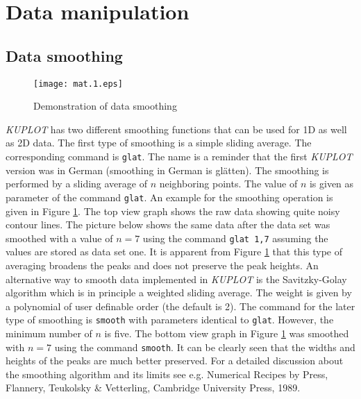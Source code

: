 
\section{Data manipulation \label{mat-man}}

\subsection{Data smoothing \label{mat-smooth}}

\begin{figure}[!ptb]
   \centering
   \texttt{[image: mat.1.eps]}
   \caption{Demonstration of data smoothing}
   \label{mat-fig1}
\end{figure}

{\it KUPLOT} has two different smoothing functions that can be used
for 1D as well as 2D data. The first type of smoothing is a simple
sliding average. The corresponding command is {\tt glat}. The name
is a reminder that the first {\it KUPLOT} version was in German
(smoothing in German is gl\"atten). The smoothing is performed by a
sliding average of $n$ neighboring points. The value of $n$ is given
as parameter of the command {\tt glat}. An example for the smoothing
operation is given in Figure \ref{mat-fig1}. The top view graph
shows the raw data showing quite noisy contour lines. The picture
below shows the same data after the data set was smoothed with a
value of $n=7$ using the command {\tt glat 1,7} assuming the values
are stored as data set one. It is apparent from Figure
\ref{mat-fig1} that this type of averaging broadens the peaks and
does not preserve the peak heights. An alternative way to smooth
data implemented in {\it KUPLOT} is the Savitzky-Golay algorithm
which is in principle a weighted sliding average. The weight is
given by a polynomial of user definable order (the default is 2).
The command for the later type of smoothing is {\tt smooth} with
parameters identical to {\tt glat}. However, the minimum number of
$n$ is five. The bottom view graph in Figure \ref{mat-fig1} was
smoothed with $n=7$ using the command {\tt smooth}. It can be
clearly seen that the widths and heights of the peaks are much
better preserved. For a detailed discussion about the smoothing
algorithm and its limits see e.g. Numerical Recipes by Press,
Flannery, Teukolsky \& Vetterling, Cambridge University Press, 1989.
\par

